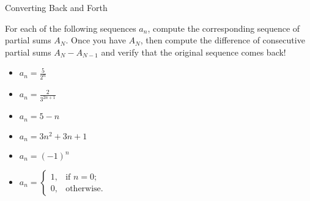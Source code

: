 \begin{exercise}{Converting Back and Forth \Coffeecup \Coffeecup \Coffeecup}

For each of the following sequences $a_n$, compute the corresponding sequence of partial sums $A_N$.  Once you have $A_N$, then compute the difference of consecutive partial sums $A_{N}-A_{N-1}$ and verify that the original sequence comes back!

\begin{itemize}
\item $a_n=\frac{5}{2^n}$
\vspace*{1in}
\item $a_n=\frac{2}{3^{2n+1}}$
\vspace*{1in}
\item $a_n=5-n$
\vspace*{1in}
\item $a_n=3n^2+3n+1$
\vspace*{1in}
\item $a_n=\left(-1\right)^n$
\vspace*{1in}
\item $a_n=\begin{cases}
1, & \text{if $n=0$;} \\
0, & \text{otherwise.}
\end{cases}$
\vspace*{1in}
\end{itemize}
\end{exercise}

